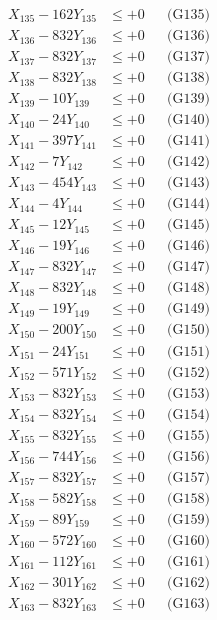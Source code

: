 \documentclass[a4paper,10pt]{article}
\begin{document}
{\begin{align}
X_{135} - 162Y_{135} &\leq +0 && \text{(G135)} \\
X_{136} - 832Y_{136} &\leq +0 && \text{(G136)} \\
X_{137} - 832Y_{137} &\leq +0 && \text{(G137)} \\
X_{138} - 832Y_{138} &\leq +0 && \text{(G138)} \\
X_{139} - 10Y_{139} &\leq +0 && \text{(G139)} \\
X_{140} - 24Y_{140} &\leq +0 && \text{(G140)} \\
\allowbreak
X_{141} - 397Y_{141} &\leq +0 && \text{(G141)} \\
X_{142} - 7Y_{142} &\leq +0 && \text{(G142)} \\
X_{143} - 454Y_{143} &\leq +0 && \text{(G143)} \\
X_{144} - 4Y_{144} &\leq +0 && \text{(G144)} \\
X_{145} - 12Y_{145} &\leq +0 && \text{(G145)} \\
X_{146} - 19Y_{146} &\leq +0 && \text{(G146)} \\
X_{147} - 832Y_{147} &\leq +0 && \text{(G147)} \\
X_{148} - 832Y_{148} &\leq +0 && \text{(G148)} \\
X_{149} - 19Y_{149} &\leq +0 && \text{(G149)} \\
X_{150} - 200Y_{150} &\leq +0 && \text{(G150)} \\
\allowbreak
X_{151} - 24Y_{151} &\leq +0 && \text{(G151)} \\
X_{152} - 571Y_{152} &\leq +0 && \text{(G152)} \\
X_{153} - 832Y_{153} &\leq +0 && \text{(G153)} \\
X_{154} - 832Y_{154} &\leq +0 && \text{(G154)} \\
X_{155} - 832Y_{155} &\leq +0 && \text{(G155)} \\
X_{156} - 744Y_{156} &\leq +0 && \text{(G156)} \\
X_{157} - 832Y_{157} &\leq +0 && \text{(G157)} \\
X_{158} - 582Y_{158} &\leq +0 && \text{(G158)} \\
X_{159} - 89Y_{159} &\leq +0 && \text{(G159)} \\
X_{160} - 572Y_{160} &\leq +0 && \text{(G160)} \\
\allowbreak
X_{161} - 112Y_{161} &\leq +0 && \text{(G161)} \\
X_{162} - 301Y_{162} &\leq +0 && \text{(G162)} \\
X_{163} - 832Y_{163} &\leq +0 && \text{(G163)} \\

\end{align}}
\end{document}
